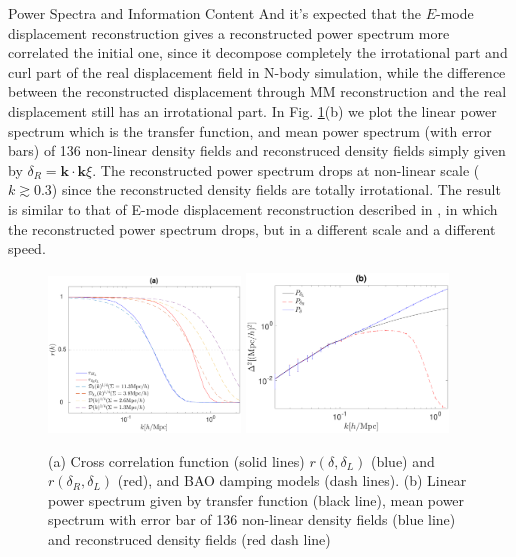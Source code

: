 \begin{section}{Power Spectra and Information Content}
And it's expected that the $E$-mode displacement reconstruction gives a reconstructed power spectrum more correlated 
the initial one, since it decompose completely the irrotational part and curl part of the real displacement 
field in N-body simulation, while the difference between the reconstructed displacement through MM reconstruction 
and the real displacement still has an irrotational part.
 In Fig. \ref{fig:cross-correlation-power}(b) we plot the linear power spectrum which is the transfer function, and mean 
power spectrum (with error bars) of 136 non-linear density fields and reconstruced density fields simply 
given by $\delta_R=\bm{k}\cdot\bm{k}\xi$. The reconstructed power spectrum drops at non-linear scale ($k \gtrsim 0.3$) 
since the reconstructed density fields are totally irrotational. The result is similar to that of 
E-mode displacement reconstruction described in \cite{bib:Yu2016}, in which the reconstructed power spectrum 
drops, but in a different scale and a different speed.
\begin{figure}
\centering
\includegraphics[width=0.455\textwidth]{cross_correlation_best_analysis-crop.pdf} 
\includegraphics[width=0.48\textwidth]{power_best_analysis-crop.pdf}
\caption{(a) Cross correlation function (solid lines) $r(\delta,\delta_L)$ (blue) and $r(\delta_R,\delta_L)$ (red), 
and BAO damping models (dash lines). 
(b) Linear power spectrum given by transfer function (black line), mean power spectrum with error bar of
136 non-linear density fields (blue line) and reconstruced density fields (red dash line)}
\label{fig:cross-correlation-power}
\end{figure}


\end{section}
